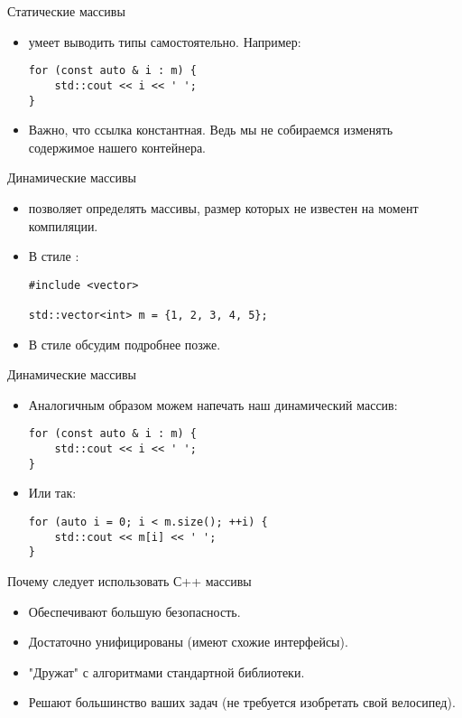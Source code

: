 \documentclass{beamer}
\begin{document}
\begin{frame}[fragile]{Статические массивы}
    \begin{itemize}
        \item \langcpp умеет выводить типы самостоятельно. Например:
            \begin{lstlisting}
for (const auto & i : m) {
    std::cout << i << ' '; 
}
            \end{lstlisting}
        \item Важно, что ссылка константная. 
            Ведь мы не собираемся изменять содержимое нашего контейнера. 
    \end{itemize}
\end{frame}

\begin{frame}[fragile]{Динамические массивы}
    \begin{itemize}
        \item \langcpp позволяет определять массивы, 
            размер которых не известен на момент компиляции.
        \item В стиле \langcpp:
            \begin{lstlisting}
#include <vector>

std::vector<int> m = {1, 2, 3, 4, 5}; 
            \end{lstlisting}
        \item В стиле \langc обсудим подробнее позже.
    \end{itemize}
\end{frame}

\begin{frame}[fragile]{Динамические массивы}
    \begin{itemize}
    \item Аналогичным образом можем напечать наш динамический массив:
        \begin{lstlisting}
for (const auto & i : m) {
    std::cout << i << ' '; 
}
        \end{lstlisting}
    \item Или так:
        \begin{lstlisting}
for (auto i = 0; i < m.size(); ++i) {
    std::cout << m[i] << ' '; 
}
        \end{lstlisting}
    \end{itemize}
\end{frame}

\begin{frame}[fragile]{Почему следует использовать С++ массивы}
    \begin{itemize}
        \item Обеспечивают большую безопасность.
        \item Достаточно унифицированы (имеют схожие интерфейсы).
        \item "Дружат" с алгоритмами стандартной библиотеки.
        \item Решают большинство ваших задач (не требуется изобретать свой велосипед).
    \end{itemize}
\end{frame}
\end{document}
